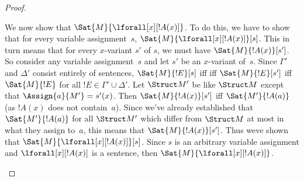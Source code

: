\documentclass[../../include/open-logic-section]{subfiles}
\begin{document}
\begin{proof}
\begin{enumerate}
  We now show that $\Sat{M}{\lforall[x][!A(x)]}$.  To do this, we have
  to show that for every variable assignment~$s$,
  $\Sat{M}{\lforall[x][!A(x)]}[s]$. This in turn means that for every
  $x$-variant $s'$ of $s$, we must have $\Sat{M}{!A(x)}[s']$.  So
  consider any variable assignment~$s$ and let $s'$ be an $x$-variant
  of~$s$. Since $\Gamma'$ and $\Delta'$ consist entirely of sentences,
  $\Sat{M}{!E}[s]$ iff iff $\Sat{M}{!E}[s']$ iff $\Sat{M}{!E}$ for all
  $!E \in \Gamma' \cup \Delta'$.  Let $\Struct M'$ be like $\Struct M$
  except that $\Assign{a}{M'} = s'(x)$.  Then $\Sat{M}{!A(x)}[s']$ iff
  $\Sat{M'}{!A(a)}$ (as $!A(x)$ does not contain~$a$). Since we've
  already established that $\Sat{M'}{!A(a)}$ for all $\Struct M'$
  which differ from $\Struct M$ at most in what they assign to~$a$,
  this means that $\Sat{M}{!A(x)}[s']$.  Thus weve shown that
  $\Sat{M}{\lforall[x][!A(x)]}[s]$. Since $s$ is an arbitrary variable
  assignment and $\lforall[x][!A(x)]$ is a sentence, then
  $\Sat{M}{\lforall[x][!A(x)]}$.


\end{enumerate}
\end{proof}
\end{document}
